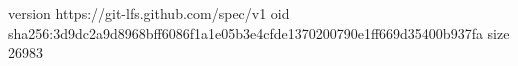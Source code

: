 version https://git-lfs.github.com/spec/v1
oid sha256:3d9dc2a9d8968bff6086f1a1e05b3e4cfde1370200790e1ff669d35400b937fa
size 26983
